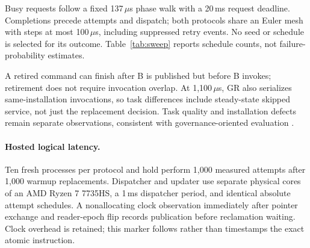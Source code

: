 \documentclass{article}
\begin{document}
Busy requests follow a fixed 137\,$\mu$s phase walk with a 20\,ms request deadline. Completions precede attempts and dispatch; both protocols share an Euler mesh with steps at most 100\,$\mu$s, including suppressed retry events. No seed or schedule is selected for its outcome. Table~\ref{tab:sweep} reports schedule counts, not failure-probability estimates.

\begin{table}[!ht]
\caption{Complete replay sweep: 50 schedules per row and protocol, four proposals per schedule. Counts are schedules with at least one event. RMSE is median post-shift tracking error across schedules. The 1,100\,$\mu$s rows form a separate above-period stress stratum.}
\label{tab:sweep}
\centering\small

\end{table}

\SweepInterpretation{}
A retired command can finish after B is published but before B invokes; retirement does not require invocation overlap.
At 1,100\,$\mu$s, GR also serializes same-installation invocations, so task differences include steady-state skipped service, not just the replacement decision. Task quality and installation defects remain separate observations, consistent with governance-oriented evaluation \citep{qin2026govbench}.

\paragraph{Hosted logical latency.}
Ten fresh processes per protocol and hold perform 1,000 measured attempts after 1,000 warmup replacements. Dispatcher and updater use separate physical cores of an AMD Ryzen 7 7735HS, a 1\,ms dispatcher period, and identical absolute attempt schedules. A nonallocating clock observation immediately after pointer exchange and reader-epoch flip records publication before reclamation waiting. Clock overhead is retained; this marker follows rather than timestamps the exact atomic instruction.

\begin{table}[!ht]
\caption{Hosted latency in $\mu$s: medians across process-level medians/p99s, conditional on completion. Publication columns start at the first scheduled request and include scheduler delay, updater backlog, pre-call setup, Busy attempts and retry gaps through the post-swap observation. Counts include censored requests. Appendix~\ref{app:measurement} reports both endpoints, maxima, p95s, threshold denominators and unfinished requests. No real-time guarantees.}
\label{tab:costs}
\centering\small

\end{table}
\end{document}
